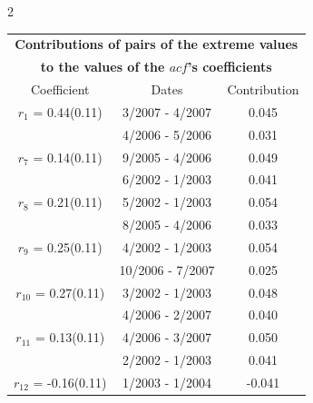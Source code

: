 
\thispagestyle{empty}
\begin{multicols}{2}{ 
\begin{tabular}{ccc}
\multicolumn{3}{c}{\textbf{Contributions of pairs of the extreme values} }  \vspace{-.10in}  \\ 
\multicolumn{3}{c}{ \textbf{to the values of the $acf$'s coefficients}} \\ 
\hline 
\hline                  Coefficient  &  Dates &  Contribution \\ 
\hline 
  $r_{ 1}$ = 0.44(0.11) &       3/2007 -  4/2007 &        0.045   \vspace{-.10in} \\  
&        4/2006 -  5/2006 &        0.031  \vspace{-.02in} \\ \hline 
  $r_{ 7}$ = 0.14(0.11) &       9/2005 -  4/2006 &        0.049   \vspace{-.10in} \\  
&        6/2002 -  1/2003 &        0.041  \vspace{-.02in} \\ \hline 
  $r_{ 8}$ = 0.21(0.11) &       5/2002 -  1/2003 &        0.054   \vspace{-.10in} \\  
&        8/2005 -  4/2006 &        0.033  \vspace{-.02in} \\ \hline 
  $r_{ 9}$ = 0.25(0.11) &       4/2002 -  1/2003 &        0.054   \vspace{-.10in} \\  
&       10/2006 -  7/2007 &        0.025  \vspace{-.02in} \\ \hline 
  $r_{10}$ = 0.27(0.11) &       3/2002 -  1/2003 &        0.048   \vspace{-.10in} \\  
&        4/2006 -  2/2007 &        0.040  \vspace{-.02in} \\ \hline 
  $r_{11}$ = 0.13(0.11) &       4/2006 -  3/2007 &        0.050   \vspace{-.10in} \\  
&        2/2002 -  1/2003 &        0.041  \vspace{-.02in} \\ \hline 
  $r_{12}$ = -0.16(0.11) &       1/2003 -  1/2004 &       -0.041    \vspace{-.10in} \\ 

\end{tabular}}
\end{multicols}
